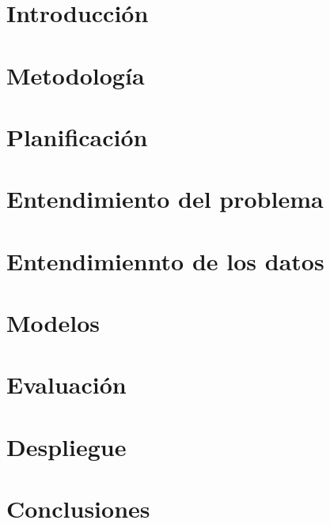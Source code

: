 \documentclass[openright,twoside,10pt]{book}
\begin{document}
\chapter{Introducción}\label{cap.introduccion}


\chapter{Metodología}\label{cap.metodologia}


\chapter{Planificación}
\label{cap.req-planificacion}

\chapter{Entendimiento del problema}\label{cap.ent.problema}


\chapter{Entendimiennto de los datos}\label{cap.ent-datos}


\chapter{Modelos}\label{cap.modelos}


\chapter{Evaluación}\label{cap.test}


\chapter{Despliegue}\label{cap.despliegue}


%


\chapter{Conclusiones}\label{cap.conclusiones}

\end{document}
